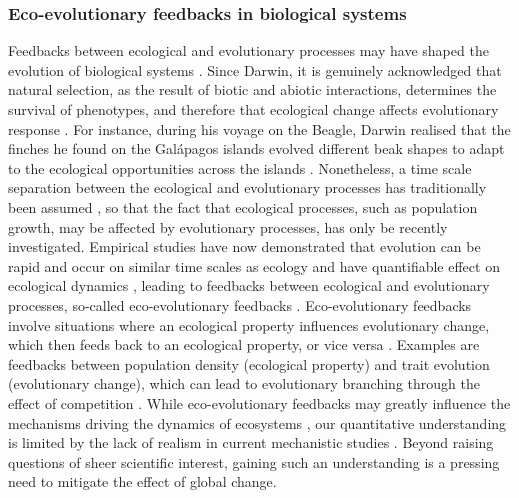 \subsubsection*{Eco-evolutionary feedbacks in biological systems}
% 
Feedbacks between ecological and evolutionary processes may have shaped the evolution of biological systems \cite{Pelletier2009}.
% 
Since Darwin, it is genuinely acknowledged that natural selection, as the result of biotic and abiotic interactions, determines the survival of phenotypes, and therefore that ecological change affects evolutionary response \cite{Ezard2009}.
% 
For instance, during his voyage on the Beagle, Darwin realised that the finches he found on the Galápagos islands evolved different beak shapes to adapt to the ecological opportunities across the islands \cite{darwin2004origin}.
% 
Nonetheless, a time scale separation between the ecological and evolutionary processes has traditionally been assumed \cite{slobodkin1980growth}, so that the fact that ecological processes, such as population growth, may be affected by evolutionary processes, has only be recently investigated. Empirical studies have now demonstrated that evolution can be rapid and occur on similar time scales as ecology \cite{Hairston2005, Pelletier2009} and have quantifiable effect on ecological dynamics \cite{Ezard2009}, leading to feedbacks between ecological and evolutionary processes, so-called eco-evolutionary feedbacks \cite{Pelletier2009,Schoener2011}. 
% 
Eco-evolutionary feedbacks involve situations where an ecological property influences evolutionary change, which then feeds back to an ecological property, or vice versa \cite{Govaert2019a}. Examples are feedbacks between population density (ecological property) and trait evolution (evolutionary change), which can lead to evolutionary branching through the effect of competition \cite{Doebeli1999}.
% 
% 
While eco-evolutionary feedbacks may greatly influence the mechanisms driving the dynamics of ecosystems \cite{Urban2016}, our quantitative understanding is limited by the lack of realism in current mechanistic studies \cite{Lion2022}. Beyond raising questions of sheer scientific interest, gaining such an understanding is a pressing need to mitigate the effect of global change.

